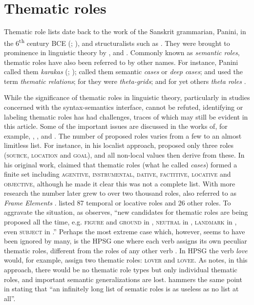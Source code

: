 \documentclass[output=paper]{langsci/langscibook}
\begin{document}
\section{Thematic roles}\label{sec:sibanda:}

Thematic role lists date back to the work of the Sanskrit grammarian, Panini, in the 6\textsuperscript{th} century BCE (\citealt[548]{Dowty1991}; \citealt[19-20]{Srikumar2013}), and structuralists such as \citet{Blake1930}. They were brought to prominence in linguistic theory by \citet{Gruber1965,Fillmore1968,Fillmore1977}, and \citet{Jackendoff1972,Jackendoff1976}. Commonly known as \textit{semantic roles}, thematic roles have also been referred to by other names. For instance, Panini called them \textit{karakas} (\citealt[548]{Dowty1991}; \citealt[19-20]{Srikumar2013,Cardona1974}); \citet{Fillmore1968} called them semantic \textit{cases} or \textit{deep cases}; \citet{Gruber1965,Gruber1976} and \citet{Jackendoff1972} used the term \textit{thematic relations}; for \citet{Stowell1981} they were \textit{theta-grids}; and for yet others \textit{theta roles} \citep{Chomsky1981,Marantz1984}. 

While the significance of thematic roles in linguistic theory, particularly in studies concerned with the syntax-semantics interface, cannot be refuted, identifying or labeling thematic roles has had challenges, traces of which may still be evident in this article. Some of the important issues are discussed in the works of, for example, \citet{Dowty1991}, \citet{Jackendoff1987}, \citet[689]{Newmeyer2010} and \citet[6]{KittilaEtAl2011}. The number of proposed roles varies from a few to an almost limitless list. For instance, in his localist approach, \citet{Anderson1971} proposed only three roles (\textsc{source, location} and \textsc{goal}), and all non-local values then derive from these. In his original work, \citet{Fillmore1968} claimed that thematic roles (what he called \textit{cases}) formed a finite set including \textsc{agentive, instrumental, dative, factitive, locative} and \textsc{objective,} although he made it clear this was not a complete list. With more research the number later grew to over two thousand roles, also referred to as \textit{Frame Elements} \citep{Fillmore1985}. \citet{Blake1930} listed 87 temporal or locative roles and 26 other roles. To aggravate the situation, as \citet[548-549]{Dowty1991} observes, “new candidates for thematic roles are being proposed all the time, e.g. \textsc{figure} and \textsc{ground} in \citealt{Talmy1985a}, \textsc{neutral} in \citealt{Rozwadowska1988}, \textsc{landmark} in \citealt{Jackendoff1982}, even \textsc{subject} in \citealt{Baker1985}.” Perhaps the most extreme case which, however, seems to have been ignored by many, is the HPSG one where each verb assigns its own peculiar thematic roles, different from the roles of any other verb \citep{PollardSag1994}. In HPSG the verb \textit{love} would, for example, assign two thematic roles: \textsc{lover} and \textsc{lovee}. As \citet{Dowty1989} notes, in this approach, there would be no thematic role types but only individual thematic roles, and important semantic generalizations are lost. \citet[52]{Payne1997} hammers the same point in stating that “an infinitely long list of sematic roles is as useless as no list at all”.
\end{document}
